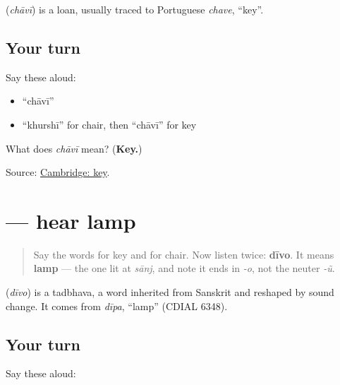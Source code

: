 \begin{cousinweb}
\textbf{} (\emph{chāvī}) is a loan, usually traced to Portuguese \emph{chave}, \textquotedblleft{}key\textquotedblright{}.
\end{cousinweb}

\subsection*{Your turn}
Say these aloud:

\begin{itemize}
\raggedright
  \item \textquotedblleft{}chāvī\textquotedblright{}
  \item \textquotedblleft{}khurshī\textquotedblright{} for chair, then \textquotedblleft{}chāvī\textquotedblright{} for key
\end{itemize}

\begin{tcolorbox}[breakable,colback=teal!4,colframe=teal!35!black,title={Before you move on}]
What does \emph{chāvī} mean? (\textbf{Key.})

Source: \href{https://dictionary.cambridge.org/dictionary/english-gujarati/key}{Cambridge: key}.
\end{tcolorbox}
\section[\texorpdfstring{\gu{દીવો} (dīvo)}{દીવો (dīvo)}]{ — hear lamp}

\label{lesson:GU-C28-hear-divo}



\begin{quote}
Say the words for key and for chair. Now listen twice: \textbf{dīvo}. It means \textbf{lamp} — the one lit at \emph{sānj}, and note it ends in \emph{-o}, not the neuter \emph{-ũ}.
\end{quote}

\begin{cousinweb}
\textbf{} (\emph{dīvo}) is a tadbhava, a word inherited from Sanskrit and reshaped by sound change. It comes from \emph{dīpa}, \textquotedblleft{}lamp\textquotedblright{} (CDIAL 6348).
\end{cousinweb}

\subsection*{Your turn}
Say these aloud:

